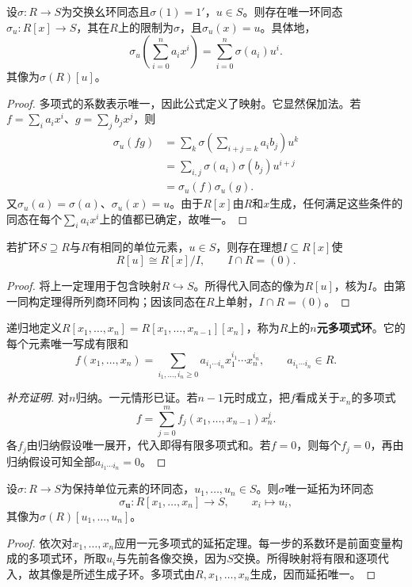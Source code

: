 \begin{theorem}\label{p2:poly-universal}
设$\sigma:R\to S$为交换幺环同态且$\sigma(1)=1'$，$u\in S$。则存在唯一环同态$\sigma_u:R[x]\to S$，其在$R$上的限制为$\sigma$，且$\sigma_u(x)=u$。具体地，
\[
\sigma_u\!\left(\sum_{i=0}^n a_ix^i\right)
=\sum_{i=0}^n\sigma(a_i)u^i.
\]
其像为$\sigma(R)[u]$。
\end{theorem}
\begin{proof}
多项式的系数表示唯一，因此公式定义了映射。它显然保加法。若$f=\sum_i a_ix^i$、$g=\sum_jb_jx^j$，则
\begin{align*}
\sigma_u(fg)
&=\sum_k\sigma\!\left(\sum_{i+j=k}a_ib_j\right)u^k\\
&=\sum_{i,j}\sigma(a_i)\sigma(b_j)u^{i+j}\\
&=\sigma_u(f)\sigma_u(g).
\end{align*}
又$\sigma_u(a)=\sigma(a)$、$\sigma_u(x)=u$。由于$R[x]$由$R$和$x$生成，任何满足这些条件的同态在每个$\sum_i a_ix^i$上的值都已确定，故唯一。
\end{proof}

\begin{corollary}
若扩环$S\supseteq R$与$R$有相同的单位元素，$u\in S$，则存在理想$I\subseteq R[x]$使
\[
R[u]\cong R[x]/I,\qquad I\cap R=(0).
\]
\end{corollary}
\begin{proof}
将上一定理用于包含映射$R\hookrightarrow S$。所得代入同态的像为$R[u]$，核为$I$。由第一同构定理得所列商环同构；因该同态在$R$上单射，$I\cap R=(0)$。
\end{proof}

\begin{definition}
递归地定义$R[x_1,\ldots,x_n]=R[x_1,\ldots,x_{n-1}][x_n]$，称为$R$上的\textbf{$n$元多项式环}。它的每个元素唯一写成有限和
\[
f(x_1,\ldots,x_n)=\sum_{i_1,\ldots,i_n\geq0}
a_{i_1\cdots i_n}x_1^{i_1}\cdots x_n^{i_n},
\qquad a_{i_1\cdots i_n}\in R.
\]
\end{definition}
\begin{proof}[补充证明]
对$n$归纳。一元情形已证。若$n-1$元时成立，把$f$看成关于$x_n$的多项式
\[
f=\sum_{j=0}^m f_j(x_1,\ldots,x_{n-1})x_n^j.
\]
各$f_j$由归纳假设唯一展开，代入即得有限多项式和。若$f=0$，则每个$f_j=0$，再由归纳假设可知全部$a_{i_1\cdots i_n}=0$。
\end{proof}

\begin{theorem}\label{p2:multi-poly-universal}
设$\sigma:R\to S$为保持单位元素的环同态，$u_1,\ldots,u_n\in S$。则$\sigma$唯一延拓为环同态
\[
\sigma_{\mathbf u}:R[x_1,\ldots,x_n]\to S,
\qquad x_i\longmapsto u_i,
\]
其像为$\sigma(R)[u_1,\ldots,u_n]$。
\end{theorem}
\begin{proof}
依次对$x_1,\ldots,x_n$应用一元多项式的延拓定理。每一步的系数环是前面变量构成的多项式环，所取$u_i$与先前各像交换，因为$S$交换。所得映射将有限和逐项代入，故其像是所述生成子环。多项式由$R,x_1,\ldots,x_n$生成，因而延拓唯一。
\end{proof}

